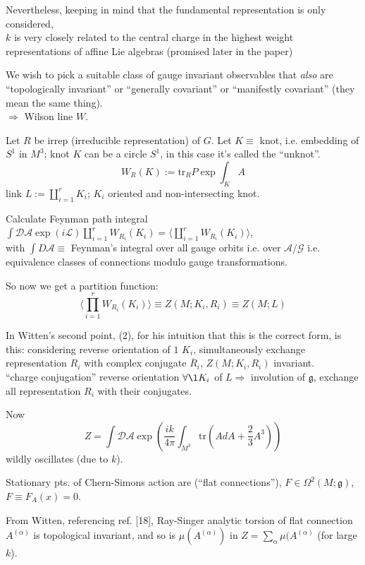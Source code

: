 \documentclass[10pt]{amsart}
\begin{document}
\begin{multicols}{2}
Nevertheless, keeping in mind that the fundamental representation is only considered, \\
$k$ is very closely related to the central charge in the highest weight representations of affine Lie algebras (promised later in the paper)

We wish to pick a suitable class of gauge invariant observables that \emph{also} are ``topologically invariant'' or ``generally covariant'' or ``manifestly covariant'' (they mean the same thing).  \\
$\Longrightarrow $ Wilson line $W$.  

Let $R$ be irrep (irreducible representation) of $G$.  Let $K \equiv $ knot, i.e. embedding of $S^1$ in $M^3$; knot $K$ can be a circle $S^1$, in this case it's called the ``unknot''.
\[
W_R(K) := \text{tr}_R P\exp{ \int_K A}
\]
link $L := \coprod_{i=1}^r K_i $; $K_i$ oriented and non-intersecting knot.

Calculate Feynman path integral $\int \mathcal{D}\mathcal{A} \exp{ (i\mathcal{L})} \coprod_{i=1}^r W_{R_i}(K_i) = \langle \coprod_{i=1}^r W_{R_i}(K_i) \rangle$, \\
  with $\int D\mathcal{A} \equiv $ Feynman's integral over all gauge orbits i.e. over $\mathcal{A}/\mathcal{G}$ i.e. equivalence classes of connections modulo gauge transformations.

So now we get a partition function:
  \[
\langle \prod_{i=1}^r W_{R_i}(K_i) \rangle \equiv Z(M; K_i , R_i) \equiv Z(M;L)
\]

In Witten's second point, (2), for his intuition that this is the correct form, is this: considering reverse orientation of $1$ $K_i$, simultaneously exchange representation $R_i$ with complex conjugate $\overline{R}_i$, $Z(M;K_i,R_i)$ invariant.  \\
``charge conjugation'' reverse orientation $\forall \l K_i $ of $L \Longrightarrow $ involution of $\mathfrak{g}$, exchange all representation $R_i$ with their conjugates.

Now
\[
Z = \int \mathcal{D}\mathcal{A} \exp{ \left( \frac{ik}{4\pi } \int_{M^3} \text{tr}(AdA + \frac{2}{3} A^3) \right) }
\]
wildly oscillates (due to $k$).

Stationary pts. of Chern-Simons action are (``flat connections''), $F\in \Omega^2(M;\mathfrak{g})$, $F\equiv F_A(x) = 0$.

From Witten, referencing ref. [18], Ray-Singer analytic torsion of flat connection $A^{(\alpha)}$ is topological invariant, and so is $\mu(A^{(\alpha)})$ in $Z=\sum_{\alpha} \mu(A^{(\alpha)}$ (for large $k$).


\end{multicols}
\end{document}
